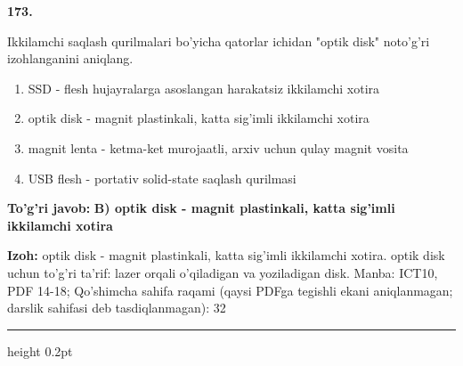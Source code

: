 \documentclass[10pt,a4paper]{article}
\begin{document}
{\bfseries\sffamily\color{ink} 173.}
\par
Ikkilamchi saqlash qurilmalari bo'yicha qatorlar ichidan "optik disk" noto'g'ri izohlanganini aniqlang.
\begin{enumerate}[label=\Alph*),leftmargin=9mm]
\item SSD - flesh hujayralarga asoslangan harakatsiz ikkilamchi xotira
\item optik disk - magnit plastinkali, katta sig'imli ikkilamchi xotira
\item magnit lenta - ketma-ket murojaatli, arxiv uchun qulay magnit vosita
\item USB flesh - portativ solid-state saqlash qurilmasi
\end{enumerate}
\begin{tcolorbox}[enhanced,breakable,colback=teal!4,colframe=teal!60!black,boxrule=0.45pt,arc=1.2mm,left=2.7mm,right=2.7mm,top=1.8mm,bottom=1.8mm,before skip=2mm,after skip=2mm]
{\bfseries\sffamily\color{teal}To'g'ri javob:} \textbf{B) optik disk - magnit plastinkali, katta sig'imli ikkilamchi xotira}
\par\smallskip
{\bfseries Izoh:} optik disk - magnit plastinkali, katta sig'imli ikkilamchi xotira. optik disk uchun to'g'ri ta'rif: lazer orqali o'qiladigan va yoziladigan disk. Manba: ICT10, PDF 14-18; Qo'shimcha sahifa raqami (qaysi PDFga tegishli ekani aniqlanmagan; darslik sahifasi deb tasdiqlanmagan): 32
\end{tcolorbox}
\vspace{2mm}\hrule height 0.2pt\vspace{3mm}
\end{document}
